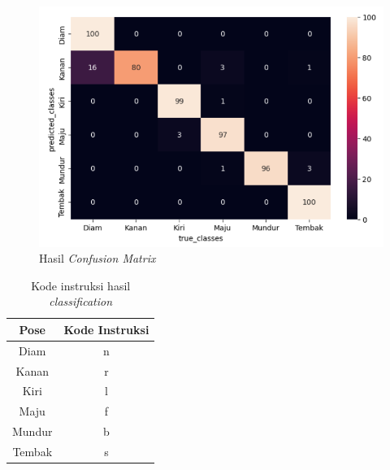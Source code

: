 \begin{figure}[H]
  \centering
  \includegraphics[width=0.7\linewidth]{../Gambar/confusionmatrix.png}
  \caption{Hasil \emph{Confusion Matrix}}
  \label{fig:confusionmatrix}
\end{figure}

\begin{table}[H]
  \centering
  \caption{Kode instruksi hasil \emph{classification}}
  \label{tab:kodeinstruksi}
  \begin{tabular}{|c|c|}
  \hline
  Pose   & Kode Instruksi \\ \hline
  Diam   & n              \\ \hline
  Kanan  & r              \\ \hline
  Kiri   & l              \\ \hline
  Maju   & f              \\ \hline
  Mundur & b              \\ \hline
  Tembak & s              \\ \hline
  \end{tabular}
\end{table}

